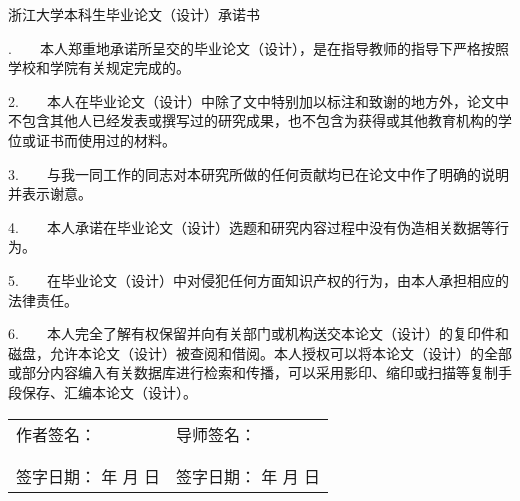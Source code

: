 {

  \setlength{\parindent}{0em}
  \linespread{1}

  \vspace*{-0.6em}

  {
    \centering
    \fangsong\sanhao\CJKfakebold
    {浙江大学本科生毕业论文（设计）承诺书} \par
  }

  \vspace{1em}

  {
    \setlength{\parindent}{2em}
    \linespread{1.8}
    \fangsong{}.~~~~本人郑重地承诺所呈交的毕业论文（设计），是在指导教师的指导下严格按照学校和学院有关规定完成的。\par
    2.~~~~本人在毕业论文（设计）中除了文中特别加以标注和致谢的地方外，论文中不包含其他人已经发表或撰写过的研究成果，也不包含为获得\underline{}或其他教育机构的学位或证书而使用过的材料。\par
    3.~~~~与我一同工作的同志对本研究所做的任何贡献均已在论文中作了明确的说明并表示谢意。 \par
    4.~~~~本人承诺在毕业论文（设计）选题和研究内容过程中没有伪造相关数据等行为。\par
    5.~~~~在毕业论文（设计）中对侵犯任何方面知识产权的行为，由本人承担相应的法律责任。\par
    6.~~~~本人完全了解\underline{}有权保留并向有关部门或机构送交本论文（设计）的复印件和磁盘，允许本论文（设计）被查阅和借阅。本人授权\underline{}可以将本论文（设计）的全部或部分内容编入有关数据库进行检索和传播，可以采用影印、缩印或扫描等复制手段保存、汇编本论文（设计）。 \par

  }

  \vspace{4.9em}

  {
    \fangsong\sihao
    \begin{tabular}{@{} p{0.5\linewidth} p{0.5\linewidth} @{}}
    作者签名： & 导师签名： \\
     & \\
     & \\
    签字日期： \hspace{2em} 年 \hspace{1em} 月 \hspace{1em} 日 & 签字日期： \hspace{2em} 年 \hspace{1em} 月 \hspace{1em} 日 \\
    \end{tabular} \par
  }
}
